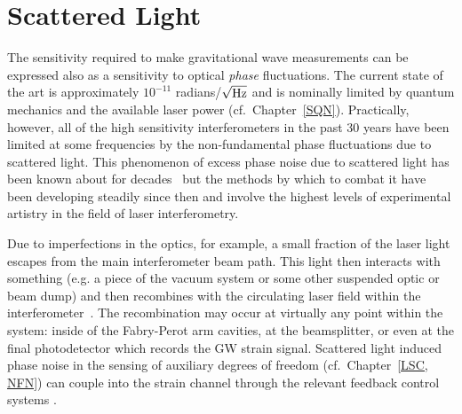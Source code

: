 \section{Scattered Light}
\label{s:IDC:scatter}
The sensitivity required to make gravitational wave measurements can
be expressed also as a sensitivity to optical \textit{phase} fluctuations.
The current state of the art is approximately
$10^{-11}$ radians/$\sqrt{\rm Hz}$ and is nominally limited by
quantum mechanics and the available laser power
(cf.~Chapter~\ref{SQN}).
Practically, however, all of the high
sensitivity interferometers in the past 30 years have been limited
at some frequencies by the non-fundamental phase fluctuations due to
scattered light. This phenomenon of excess phase noise due to scattered
light has been known about for decades~\cite{Schilling:1981} but
the methods by which to combat it have been developing steadily since
then and involve the highest levels of experimental artistry in the
field of laser interferometry.

Due to imperfections in the optics, for example, a small fraction of
the laser light escapes from the main interferometer beam path. This
light then interacts with something (e.g. a piece of the vacuum system
or some other suspended optic or beam dump) and then recombines with the
circulating laser field within the
interferometer~\cite{Kip:Scatter95, Kip:Baffles1989, Sam:Scatter2012,
Stefano:Scatter, vinet1997scattered, fritschel1998high}.
The recombination may occur at virtually any point within the system:
inside of the Fabry-Perot arm cavities, at the beamsplitter, or even at
the final photodetector which records the GW strain signal. Scattered
light induced phase noise in the sensing of auxiliary degrees of
freedom (cf.~Chapter~\ref{LSC, NFN}) can couple into the strain channel
through the relevant feedback control systems .



